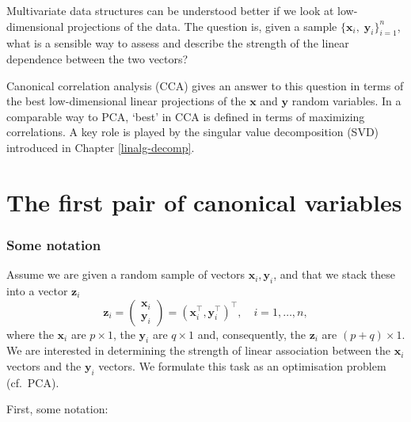 \documentclass[
]{book}
\theoremstyle{definition}
\theoremstyle{definition}
\theoremstyle{definition}
\theoremstyle{definition}
\theoremstyle{remark}
\begin{document}
Multivariate data structures can be understood better if we look at low-dimensional projections of the data. The question is, given a sample \(\{\mathbf x_i, \; \mathbf y_i\}_{i=1}^{n}\), what is a sensible way to assess and describe the strength of the linear dependence between the two vectors?

Canonical correlation analysis (CCA) gives an answer to this question in terms of the best low-dimensional linear projections of the \(\mathbf x\) and \(\mathbf y\) random variables. In a comparable way to PCA, `best' in CCA is defined in terms of maximizing correlations.
A key role is played by the singular value decomposition (SVD) introduced in Chapter \ref{linalg-decomp}.

\section{The first pair of canonical variables}\label{cca1}

\subsubsection*{Some notation}\label{some-notation}

Assume we are given a random sample of vectors \(\mathbf x_i, \mathbf y_i\), and that we stack these into a vector \(\mathbf z_i\)
\[
\mathbf z_i=\left(\begin{array}{c}
\mathbf x_i\\
\mathbf y_i
\end{array}\right)=(\mathbf x_i^\top , \mathbf y_i^\top )^\top,\quad  i=1,\ldots, n,
\]
where
the \(\mathbf x_i\) are \(p \times 1\), the \(\mathbf y_i\) are \(q \times 1\) and, consequently, the \(\mathbf z_i\) are \((p+q)\times 1\). We are interested in determining the strength of linear association between the \(\mathbf x_i\) vectors and the \(\mathbf y_i\) vectors.
We formulate this task as an optimisation problem (cf.~PCA).

First, some notation:
\end{document}
